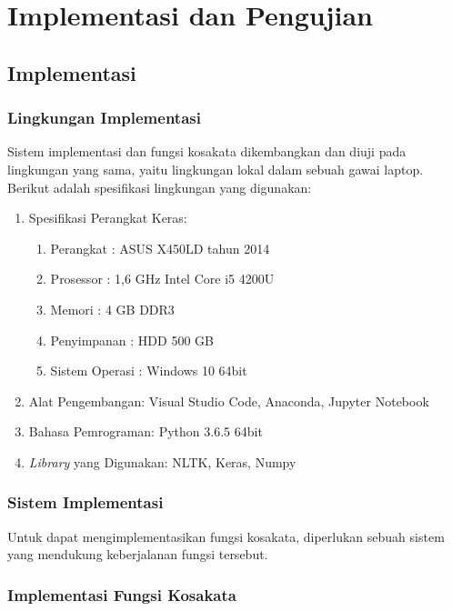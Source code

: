 \chapter{Implementasi dan Pengujian}

\section{Implementasi}

\subsection{Lingkungan Implementasi}

Sistem implementasi dan fungsi kosakata dikembangkan dan diuji pada lingkungan yang sama, yaitu lingkungan lokal dalam sebuah gawai laptop. Berikut adalah spesifikasi lingkungan yang digunakan:

\begin{enumerate}
    \item Spesifikasi Perangkat Keras:
    \begin{enumerate}
        \item Perangkat \tab : ASUS X450LD tahun 2014
        \item Prosessor \tab : 1,6 GHz Intel Core i5 4200U
        \item Memori \tab : 4 GB DDR3
        \item Penyimpanan \tab : HDD 500 GB
        \item Sistem Operasi \tab : Windows 10 64bit
    \end{enumerate}
    \item Alat Pengembangan: Visual Studio Code, Anaconda, Jupyter Notebook
    \item Bahasa Pemrograman: Python 3.6.5 64bit
    \item \textit{Library} yang Digunakan: NLTK, Keras, Numpy
\end{enumerate}

\subsection{Sistem Implementasi}

Untuk dapat mengimplementasikan fungsi kosakata, diperlukan sebuah sistem yang mendukung keberjalanan fungsi tersebut.

\subsection{Implementasi Fungsi Kosakata}

